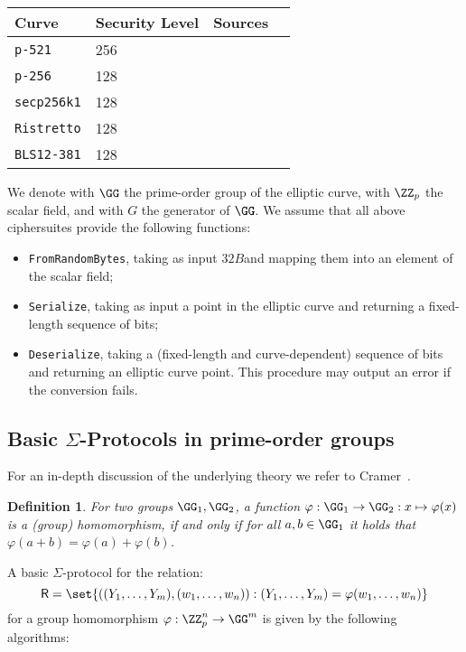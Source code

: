 \documentclass[runningheads,11pt]{article}
\newtheorem{definition}{Definition}
\newcommand{\seedlen}{\ensuremath{32B}}
\begin{document}
 \vspace{1em}
 \begin{center}
 \begin{tabular}{llcc}
  \hline
  Curve  & Security Level & Sources \\
  \hline
  \verb|p-521|     & 256& \cite{fips2} \\
  \verb|p-256|     & 128 & \cite{fips2}  \\
  \verb|secp256k1| & 128 & \cite{SECG} \\
  \verb|Ristretto| & 128 & \cite{cfrg-ristretto-decaf} \\
  \verb|BLS12-381| & 128 & \cite{bls12} \\
 \end{tabular}
\end{center}
We denote with $\GG$ the prime-order group of the elliptic curve, with $\ZZ_p$ the scalar field, and with $G$ the generator of $\GG$.
We assume that all above ciphersuites provide the following functions:

\begin{itemize}
  \item \texttt{FromRandomBytes}, taking as input \seedlen and mapping them into an element of the scalar field;
  \item \texttt{Serialize}, taking as input a point in the elliptic curve and returning a fixed-length sequence of bits;
  \item \texttt{Deserialize}, taking a (fixed-length and curve-dependent) sequence of bits and returning an elliptic curve point. This procedure may output an error if the conversion fails.
\end{itemize}

\subsection{Basic $\Sigma$-Protocols in prime-order groups}
For an in-depth discussion of the underlying theory we refer to Cramer~\cite{cramer97}.
 \begin{definition}
  For two groups $\GG_1,\GG_2$, a function $\varphi:\GG_1\to\GG_2:x\mapsto\varphi(x)$ is a \emph{(group) homomorphism}, if and only if for all $a,b\in\GG_1$ it holds that $\varphi(a+b)=\varphi(a)+\varphi(b)$.
\end{definition}




\label{sec:sigma-dlog}
A basic $\Sigma$-protocol for the relation:
\[
  \relation=\set{((\statement_1,\dots,\statement_m),(w_1,\dots,w_n)) : (\statement_1,\dots,\statement_m)=\varphi(w_1,\dots,w_n)}
\]
 for a group homomorphism $\varphi:\ZZ_p^n\to\GG^m$ is given by the following algorithms:
\end{document}
